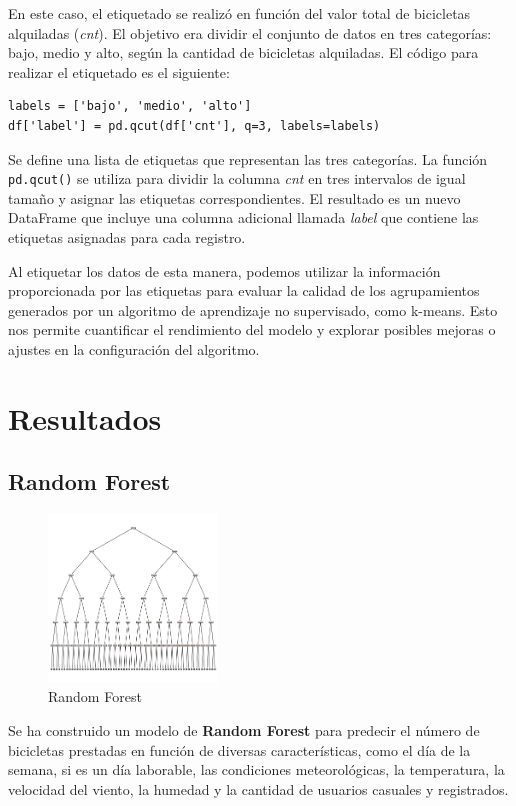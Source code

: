 \documentclass{wsdcr}
\begin{document}
En este caso, el etiquetado se realizó en función del valor total de bicicletas alquiladas (\textit{cnt}). El objetivo era dividir el conjunto de datos en tres categorías: bajo, medio y alto, según la cantidad de bicicletas alquiladas. El código para realizar el etiquetado es el siguiente:

{\fontsize{7pt}{12pt}\selectfont %
\begin{verbatim}
labels = ['bajo', 'medio', 'alto']
df['label'] = pd.qcut(df['cnt'], q=3, labels=labels)
\end{verbatim}
}

Se define una lista de etiquetas que representan las tres categorías. La función \texttt{pd.qcut()} se utiliza para dividir la columna \textit{cnt} en tres intervalos de igual tamaño y asignar las etiquetas correspondientes. El resultado es un nuevo DataFrame que incluye una columna adicional llamada \textit{label} que contiene las etiquetas asignadas para cada registro.

Al etiquetar los datos de esta manera, podemos utilizar la información proporcionada por las etiquetas para evaluar la calidad de los agrupamientos generados por un algoritmo de aprendizaje no supervisado, como k-means. Esto nos permite cuantificar el rendimiento del modelo y explorar posibles mejoras o ajustes en la configuración del algoritmo.

\section{Resultados}
\subsection{Random Forest}
\begin{figure}[h]
    \centering
    \includegraphics[width=0.4\textwidth]{charts/random_forest.png}
    \caption{Random Forest}
    \label{fig:randomforest}
\end{figure}
Se ha construido un modelo de \textbf{Random Forest} para predecir el número de bicicletas prestadas en función de diversas características, como el día de la semana, si es un día laborable, las condiciones meteorológicas, la temperatura, la velocidad del viento, la humedad y la cantidad de usuarios casuales y registrados.
\end{document}
